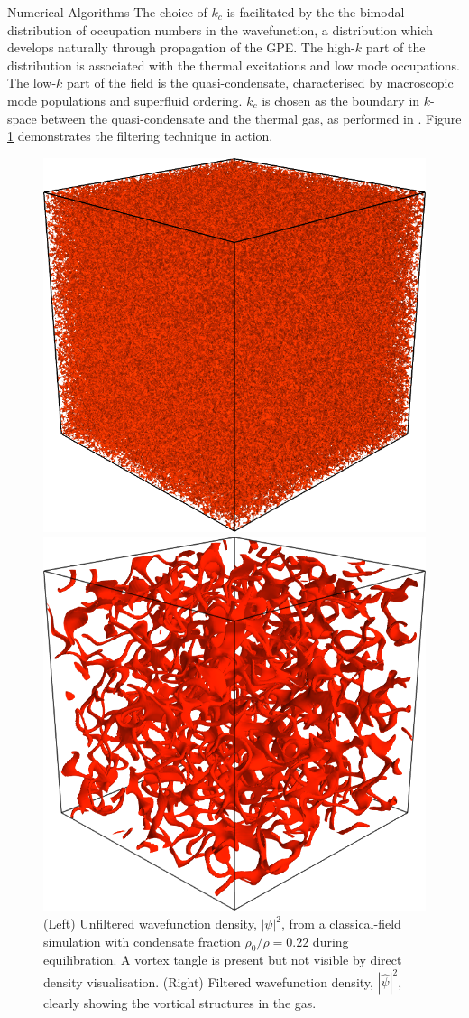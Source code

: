 \begin{chapter}{\label{cha:numerics}Numerical Algorithms}
The choice of $k_c$ is facilitated by the the bimodal distribution of occupation numbers in the wavefunction, a distribution which develops naturally through propagation of the GPE. The high-$k$ part of the distribution is associated with the thermal excitations and low mode occupations. The low-$k$ part of the field is the quasi-condensate, characterised by macroscopic mode populations and superfluid ordering. $k_c$ is chosen as the boundary in $k$-space between the quasi-condensate and the thermal gas, as performed in \cite{PhysRevA.66.013603}. Figure \ref{fig:quasicondensatefilter} demonstrates the filtering technique in action.
\begin{figure}
\centering
\includegraphics[width=0.4\linewidth]{numerics/figures/mess3d}%
    \begin{minipage}[b]{0.2\linewidth}
      \centering
      \raisebox{3cm}{$\longrightarrow$}
    \end{minipage}%
    \includegraphics[width=0.4\linewidth]{numerics/figures/clean3d}
  \caption{(Left) Unfiltered wavefunction density, $|\psi|^2$, from a classical-field simulation with condensate fraction $\rho_0/\rho=0.22$ during equilibration. A vortex tangle is present but not visible by direct density visualisation. (Right) Filtered wavefunction density, $|\hat{\psi}|^2$, clearly showing the vortical structures in the gas.}\label{fig:quasicondensatefilter}
  \end{figure}
  	

\end{chapter}
